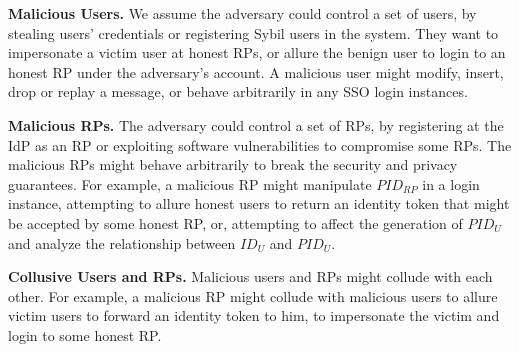 
\vspace{0.5mm}
\noindent \textbf{Malicious Users.}
We assume the adversary could control a set of users,
 by stealing users' credentials or registering Sybil users in the system.
They want to impersonate a victim user at honest RPs, or allure the benign user to login to an honest RP under the adversary's account.
A malicious user might
    modify, insert, drop or replay a message, or behave arbitrarily in any SSO login instances.



\vspace{0.5mm}
\noindent \textbf{Malicious RPs.}
The adversary could control a set of RPs, by registering at the IdP as an RP
     or exploiting software vulnerabilities to compromise some RPs.
The malicious RPs might behave arbitrarily to break the security and privacy guarantees.
For example,
a malicious RP might manipulate $PID_{RP}$ in a login instance,
    attempting to allure honest users to return an identity token that might be accepted by some honest RP,
or, attempting to affect the generation of $PID_U$ and
    analyze the relationship between $ID_U$ and $PID_U$.


\vspace{0.5mm}
\noindent \textbf{Collusive Users and RPs.} %
Malicious users and RPs might collude with each other.
For example, a malicious RP might collude with malicious users to allure victim users to forward an identity token to him,
    to impersonate the victim and login to some honest RP.

